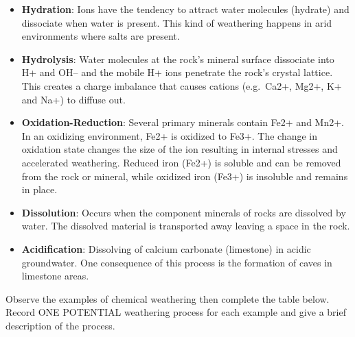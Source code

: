 \documentclass[
  letterpaper,
  twocolumn,
  portrait]{scrbook}
\begin{document}
\begin{itemize}
\item
  \textbf{Hydration}: Ions have the tendency to attract water molecules
  (hydrate) and dissociate when water is present. This kind of
  weathering happens in arid environments where salts are present.
\item
  \textbf{Hydrolysis}: Water molecules at the rock's mineral surface
  dissociate into H+ and OH-- and the mobile H+ ions penetrate the
  rock's crystal lattice. This creates a charge imbalance that causes
  cations (e.g.~Ca2+, Mg2+, K+ and Na+) to diffuse out.
\item
  \textbf{Oxidation-Reduction}: Several primary minerals contain Fe2+
  and Mn2+. In an oxidizing environment, Fe2+ is oxidized to Fe3+. The
  change in oxidation state changes the size of the ion resulting in
  internal stresses and accelerated weathering. Reduced iron (Fe2+) is
  soluble and can be removed from the rock or mineral, while oxidized
  iron (Fe3+) is insoluble and remains in place.
\item
  \textbf{Dissolution}: Occurs when the component minerals of rocks are
  dissolved by water. The dissolved material is transported away leaving
  a space in the rock.
\item
  \textbf{Acidification}: Dissolving of calcium carbonate (limestone) in
  acidic groundwater. One consequence of this process is the formation
  of caves in limestone areas.
\end{itemize}

Observe the examples of chemical weathering then complete the table
below. Record ONE POTENTIAL weathering process for each example and give
a brief description of the process.

 
  \providecommand{\huxb}[2]{\arrayrulecolor[RGB]{#1}\global\arrayrulewidth=#2pt}
  \providecommand{\huxvb}[2]{\color[RGB]{#1}\vrule width #2pt}
  \providecommand{\huxtpad}[1]{\rule{0pt}{#1}}
  \providecommand{\huxbpad}[1]{\rule[-#1]{0pt}{#1}}
\end{document}
